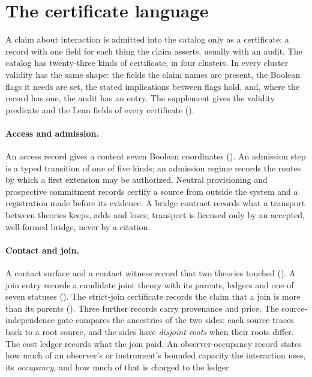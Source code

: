 \section{The certificate language}
\label{sec:certificates}

A claim about interaction is admitted into the catalog only as a certificate: a record
with one field for each thing the claim asserts, usually with an audit. The catalog has
twenty-three kinds of certificate, in four clusters. In every cluster validity has the
same shape: the fields the claim names are present, the Boolean flags it needs are set,
the stated implications between flags hold, and, where the record has one, the audit has
an entry. The supplement gives the validity predicate and the Lean fields of
every certificate ().

\paragraph{Access and admission.} An access record gives a content seven Boolean
coordinates (). An admission step is a typed transition of one of five
kinds; an admission regime records the routes by which a first extension may be
authorized. Neutral provisioning and prospective commitment records certify a source from
outside the system and a registration made before its evidence. A bridge contract records
what a transport between theories keeps, adds and loses; transport is licensed only by an
accepted, well-formed bridge, never by a citation.

\paragraph{Contact and join.} A contact surface and a contact witness record that two
theories touched (). A join entry records a candidate joint theory with
its parents, ledgers and one of seven statuses (). The strict-join
certificate records the claim that a join is more than its parents
(). Three further records carry provenance and price. The
source-independence gate compares the ancestries of the two sides: each source traces
back to a root source, and the sides have \emph{disjoint roots} when their roots differ.
The cost ledger records what the join paid. An observer-occupancy record states how much
of an observer's or instrument's bounded capacity the interaction uses, its
\emph{occupancy}, and how much of that is charged to the ledger.

